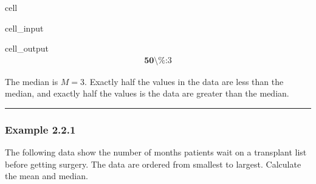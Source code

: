 \documentclass[letterpaper,10pt,english]{jupyterBook}
\begin{document}
\begin{sphinxuseclass}{cell}\begin{sphinxVerbatimInput}

\begin{sphinxuseclass}{cell_input}
\begin{sphinxVerbatim}[commandchars=\\\{\}]

\end{sphinxVerbatim}

\end{sphinxuseclass}\end{sphinxVerbatimInput}
\begin{sphinxVerbatimOutput}

\begin{sphinxuseclass}{cell_output}\begin{equation*}
\begin{split}\textbf{50\textbackslash{}\%:} 3\end{split}
\end{equation*}
\end{sphinxuseclass}\end{sphinxVerbatimOutput}

\end{sphinxuseclass}
\sphinxAtStartPar
The median is \(M = 3\). Exactly half the values in the data are less than the median, and exactly half the values is the data are greater than the median.


\bigskip\hrule\bigskip



\subsubsection{Example 2.2.1}
\label{\detokenize{Ch2 Descriptive Statistics/2.2 Measures of Central Tendency:example-2-2-1}}
\sphinxAtStartPar
The following data show the number of months patients wait on a transplant list before getting surgery. The data are ordered from smallest to largest. Calculate the mean and median.
\end{document}
